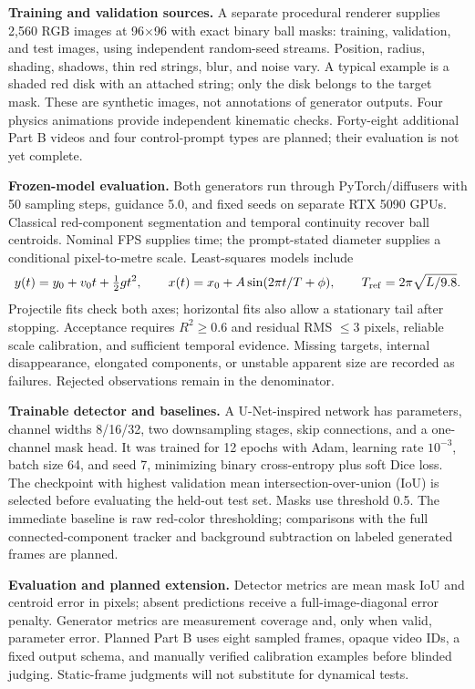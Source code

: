 \documentclass[11pt,a4paper]{article}
\newcommand{\sect}[2]{\vspace{4pt}{\large\bfseries\color{navy}#1. #2}\par\vspace{2pt}}
\begin{document}
\textbf{Training and validation sources.} A separate procedural renderer supplies
2,560 RGB images at 96$\times$96 with exact binary ball masks:
\TrainCount{} training, \ValCount{} validation, and \TestCount{} test images,
using independent random-seed streams. Position, radius, shading, shadows,
thin red strings, blur, and noise vary. A typical example is a shaded red disk
with an attached string; only the disk belongs to the target mask. These are
synthetic images, not annotations of generator outputs. Four physics animations
provide independent kinematic checks. Forty-eight additional Part B videos and
four control-prompt types are planned; their evaluation is not yet complete.

\sect{4}{Approach}
\textbf{Frozen-model evaluation.} Both generators run through PyTorch/diffusers
with 50 sampling steps, guidance 5.0, and fixed seeds on separate RTX 5090 GPUs.
Classical red-component segmentation and temporal continuity recover ball
centroids. Nominal FPS supplies time; the prompt-stated diameter supplies a
conditional pixel-to-metre scale. Least-squares models include
\begin{equation*}
 y(t)=y_0+v_0t+\tfrac12gt^2,\qquad
 x(t)=x_0+A\sin(2\pi t/T+\phi),\qquad
 T_{\rm ref}=2\pi\sqrt{L/9.8}.
\end{equation*}
Projectile fits check both axes; horizontal fits also allow a stationary tail
after stopping. Acceptance requires $R^2\geq0.6$ and residual RMS $\leq3$ pixels,
reliable scale calibration, and sufficient temporal evidence. Missing targets,
internal disappearance, elongated components, or unstable apparent size are
recorded as failures. Rejected observations remain in the denominator.

\textbf{Trainable detector and baselines.} A U-Net-inspired network has
\ParamCount{} parameters, channel widths 8/16/32, two downsampling stages,
skip connections, and a one-channel mask head. It was trained for 12 epochs
with Adam, learning rate $10^{-3}$, batch size 64, and seed 7, minimizing binary
cross-entropy plus soft Dice loss. The checkpoint with highest validation mean
intersection-over-union (IoU) is selected before evaluating the held-out test
set. Masks use threshold 0.5. The immediate baseline is raw red-color
thresholding; comparisons with the full connected-component tracker and
background subtraction on labeled generated frames are planned.

\textbf{Evaluation and planned extension.} Detector metrics are mean mask IoU
and centroid error in pixels; absent predictions receive a full-image-diagonal
error penalty. Generator metrics are measurement coverage and, only when valid,
parameter error. Planned Part B uses eight sampled frames, opaque video IDs,
a fixed output schema, and manually verified calibration examples before
blinded judging. Static-frame judgments will not substitute for dynamical tests.
\end{document}
